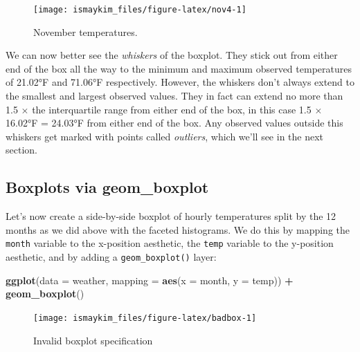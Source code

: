 \documentclass[12pt, krantz2,]{krantz}
\makeatletter
\newenvironment{Shaded}{\begin{snugshade}}{\end{snugshade}}
\newcommand{\DataTypeTok}[1]{\textcolor[rgb]{0.27,0.27,0.27}{#1}}
\newcommand{\KeywordTok}[1]{\textcolor[rgb]{0.27,0.27,0.27}{\textbf{#1}}}
\newcommand{\NormalTok}[1]{#1}
\newcommand{\OperatorTok}[1]{\textcolor[rgb]{0.43,0.43,0.43}{\textbf{#1}}}
\newcommand{\StringTok}[1]{\textcolor[rgb]{0.5,0.5,0.5}{#1}}
\newenvironment{kframe}{%
\medskip{}
\setlength{\fboxsep}{.8em}
 \def\at@end@of@kframe{}%
 \ifinner\ifhmode%
  \def\at@end@of@kframe{\end{minipage}}%
  \begin{minipage}{\columnwidth}%
 \fi\fi%
 \def\FrameCommand##1{\hskip\@totalleftmargin \hskip-\fboxsep
 \colorbox{shadecolor}{##1}\hskip-\fboxsep
     \hskip-\linewidth \hskip-\@totalleftmargin \hskip\columnwidth}%
 \MakeFramed {\advance\hsize-\width
   \@totalleftmargin\z@ \linewidth\hsize
   \@setminipage}}%
 {\par\unskip\endMakeFramed%
 \at@end@of@kframe}
\renewenvironment{Shaded}{\begin{kframe}}{\end{kframe}}
\makeatother
\begin{document}
\begin{figure}

{\centering \texttt{[image: ismaykim\_files/figure-latex/nov4-1]} 

}

\caption{November temperatures.}\label{fig:nov4}
\end{figure}

We can now better see the \emph{whiskers} of the boxplot. They stick out from either end of the box all the way to the minimum and maximum observed temperatures of 21.02°F and 71.06°F respectively. However, the whiskers don't always extend to the smallest and largest observed values. They in fact can extend no more than 1.5 \(\times\) the interquartile range from either end of the box, in this case 1.5 \(\times\) 16.02°F = 24.03°F from either end of the box. Any observed values outside this whiskers get marked with points called \emph{outliers}, which we'll see in the next section.

\hypertarget{geomboxplot}{%
\subsection{Boxplots via geom\_boxplot}\label{geomboxplot}}

Let's now create a side-by-side boxplot of hourly temperatures split by the 12 months as we did above with the faceted histograms. We do this by mapping the \texttt{month} variable to the x-position aesthetic, the \texttt{temp} variable to the y-position aesthetic, and by adding a \texttt{geom\_boxplot()} layer:

\begin{Shaded}
\begin{Highlighting}[]
\KeywordTok{ggplot}\NormalTok{(}\DataTypeTok{data =}\NormalTok{ weather, }\DataTypeTok{mapping =} \KeywordTok{aes}\NormalTok{(}\DataTypeTok{x =}\NormalTok{ month, }\DataTypeTok{y =}\NormalTok{ temp)) }\OperatorTok{+}
\StringTok{  }\KeywordTok{geom_boxplot}\NormalTok{()}
\end{Highlighting}
\end{Shaded}

\begin{figure}

{\centering \texttt{[image: ismaykim\_files/figure-latex/badbox-1]} 

}

\caption{Invalid boxplot specification}\label{fig:badbox}
\end{figure}
\end{document}
